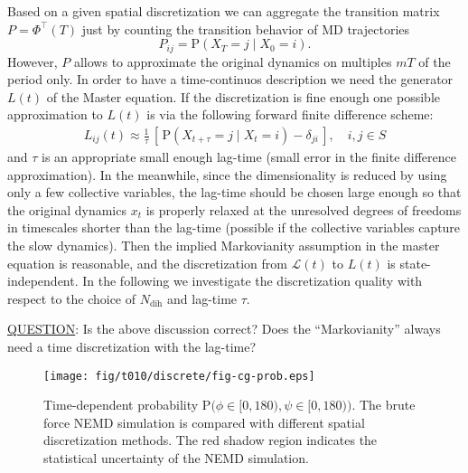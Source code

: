 \documentclass[aps, pre, preprint,unsortedaddress,a4paper,onecolumn]{revtex4}
\newcommand{\recheck}[1]{{\color{red} #1}}
\newcommand{\vect}[1]{#1}
\newcommand{\ml}[0]{\mathcal {L}}
\newcommand{\myphi}{\Phi}
\newcommand{\prob}{\textrm{P}}
\newcommand{\dih}{\textrm{dih}}
\begin{document}
Based on a given spatial discretization we can aggregate the transition matrix $\vect P=\myphi^{\top}(T)$ just by counting the transition behavior of MD trajectories 
\[
\vect P_{ij}=\prob\left(\vect X_T=j\mid \vect X_0=i \right).
\]
However, $\vect P$ allows to approximate the original dynamics on multiples $mT$ of the period only. In order to have a time-continuos description we need the generator $L(t)$ of the Master equation. 
If the discretization is fine enough one possible approximation to $L(t)$ is via
the following forward finite difference scheme:
\begin{align}
  \label{eqn:tmp4}
  L_{ij}(t) \approx \frac{1}{\tau}
  \,[\, \prob (\vect X_{t+\tau} = j \mid \vect X_{t} = i) - \delta_{ji} \,],
  \quad i,j\in S
\end{align}
and $\tau$ is an appropriate small enough lag-time \recheck{(small error in
  the finite difference approximation).}
\recheck{
  In the meanwhile,
  since the dimensionality is reduced by using only a few collective
  variables, the lag-time should be chosen large enough so that
  the original dynamics $x_t$ is properly relaxed at
  the unresolved degrees of freedoms in timescales shorter than the lag-time
  (possible if the collective variables capture the slow dynamics).
  Then the implied Markovianity assumption in the master equation is
  reasonable, and the discretization from $\ml(t)$ to $L(t)$ is state-independent.}
In the following 
we investigate the discretization
quality with respect to  the choice of $N_\dih$ and  lag-time $\tau$.

\recheck{\underline{QUESTION}: Is the above discussion correct?
  Does the ``Markovianity'' always need a time discretization with the
  lag-time?
}




\begin{figure}
  \centering
  \texttt{[image: fig/t010/discrete/fig-cg-prob.eps]}  
  \caption{Time-dependent probability $\prob\big(\phi\in[0,180), \psi\in [0,180)\big)$.  The brute force NEMD simulation is compared with different
    spatial discretization methods. The red shadow region indicates the
    statistical uncertainty of the NEMD simulation.}
  \label{fig:tmp2}
\end{figure}
\end{document}
